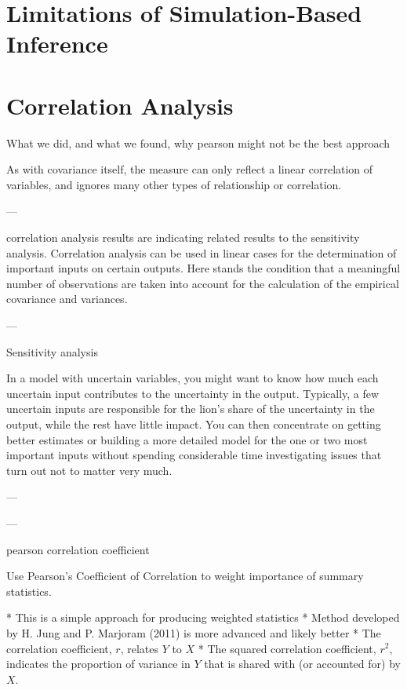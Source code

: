 \section{Limitations of Simulation-Based Inference}


\section{Correlation Analysis}

What we did, and what we found, why pearson might not be the best approach

As with covariance itself, the measure can only reflect a linear correlation of variables, and ignores many other types of relationship or correlation. 

---

correlation analysis results are indicating related results to the sensitivity analysis. Correlation analysis can be used in linear cases for the determination of important inputs on certain outputs. Here stands the condition that a meaningful number of observations are taken into account for the calculation of the empirical covariance and variances.

---

Sensitivity analysis

In a model with uncertain variables, you might want to know how much each uncertain input contributes to the uncertainty in the output. Typically, a few uncertain inputs are responsible for the lion’s share of the uncertainty in the output, while the rest have little impact. You can then concentrate on getting better estimates or building a more detailed model for the one or two most important inputs without spending considerable time investigating issues that turn out not to matter very much.

---

---

pearson correlation coefficient

Use Pearson's Coefficient of Correlation to weight importance of summary statistics.

* This is a simple approach for producing weighted statistics 
    * Method developed by H. Jung and P. Marjoram (2011) is more advanced and likely better
* The correlation coefficient, $r$, relates $Y$ to $X$ 
* The squared correlation coefficient, $r^2$, indicates the proportion of variance in $Y$ that is shared with (or accounted for) by $X$.

